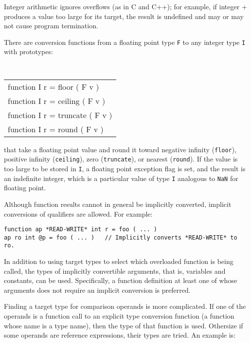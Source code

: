 \documentclass[12pt]{article}
\newenvironment{indpar}[1][0.3in]%
	{\begin{list}{}%
		     {\setlength{\itemsep}{0in}%
		      \setlength{\topsep}{0in}%
		      \setlength{\parsep}{1ex}%
		      \setlength{\labelwidth}{#1}%
		      \setlength{\leftmargin}{#1}%
		      \addtolength{\leftmargin}{\labelsep}}%
	 \item}%
	{\end{list}}
\begin{document}
Integer arithmetic ignores overflows (as in C and C++); for example,
if integer + produces a value too large for its
target, the result is undefined and may or may not cause program
termination.

There are conversion functions from a floating
point type {\tt F} to any integer type {\tt I} with prototypes:
\begin{center} \tt
\begin{tabular}{l}
function I r = floor ( F v ) \\
function I r = ceiling ( F v ) \\
function I r = truncate  ( F v ) \\
function I r = round ( F v ) \\
\end{tabular}
\end{center}
that take a floating point value and round it toward
negative infinity ({\tt floor}),
positive infinity ({\tt ceiling}),
zero ({\tt truncate}),
or nearest ({\tt round}).  If the value is too large to be stored
in {\tt I}, a floating point exception flag is set, and
the result is an indefinite integer, which is
a particular value of type {\tt I} analogous to {\tt NaN}
for floating point.

Although function results cannot in general be implicitly converted,
implicit conversions of qualifiers are allowed.  For example:

\begin{indpar}\begin{verbatim}
function ap *READ-WRITE* int r = foo ( ... )
ap ro int @p = foo ( ... )   // Implicitly converts *READ-WRITE* to ro.
\end{verbatim}\end{indpar}

In addition to using target types to select which overloaded
function is being called, the types of implicitly convertible
arguments, that is, variables and constants, can be used.
Specifically, a function definition at least one of whose arguments
does not require an implicit conversion is preferred.

Finding a target type for comparison operands is more complicated.
If one of the operands is a function call to an explicit type conversion
function (a function whose name is a type name), then the type of
that function is used.  Othersize if some operands are reference
expressions, their types are tried.  An example is:
\end{document}
